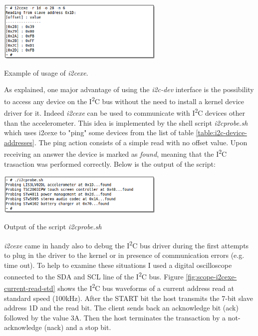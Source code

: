 \documentclass[a4paper,10pt]{article}
\makeatletter
\newenvironment{figurehere}{\def\@captype{figure}\vspace{2ex}}{\vspace{2ex}}
\newcommand{\iic}{I\textsuperscript{2}C }
\makeatother
\begin{document}
\begin{multicols}{2}
\begin{figurehere}
 \centering
 \includegraphics[width=8cm]{./figures/dump-i2cexe.png}
 \caption{Example of usage of \emph{i2cexe}.}
 \label{fig:i2cexe-dump}
\end{figurehere}

As explained, one major advantage of using the \emph{i2c-dev} interface is the
possibility to access any device on the \iic bus without the need to install a 
kernel device driver for it. Indeed \emph{i2cexe} can be used to communicate
with \iic devices other than the accelerometer. This idea is implemented by
the shell script \emph{i2cprobe.sh} which uses i2cexe to "ping" some devices
from the list  of table \ref{table:i2c-device-addresses}. The ping action
consists of a simple read with no offset value. Upon receiving an answer the
device is marked as \emph{found}, meaning that the \iic trasaction was performed
correctly. Below is the output of the script:

\begin{figurehere}
 \centering
 \includegraphics[width=8cm]{./figures/dump-i2cprobe.png}
 \caption{Output of the script \emph{i2cprobe.sh}}
 \label{fig:i2cprobe}
\end{figurehere}

\emph{i2cexe} came in handy also to debug the \iic bus driver during the first
attempts to plug in the driver to the kernel or in presence of communication
errors (e.g. time out). To help to examine these situations I used a digital
oscilloscope connected to the SDA and SCL line of the \iic bus.
Figure \ref{fig:scope-i2cexe-current-read-std} shows the \iic bus waveforms of
a current address read at standard speed (100kHz). After the START bit the host
transmits the 7-bit slave address 1D and the read bit.
The client sends back an acknowledge bit (ack) followed by the value 3A. Then the
host terminates the transaction by a not-acknowledge (nack) and a stop bit.


\end{multicols}
\end{document}
